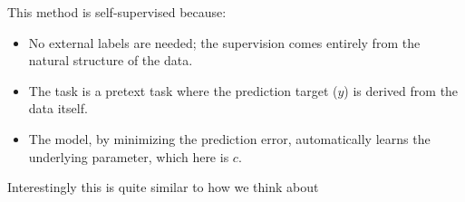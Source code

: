 \documentclass[11pt]{article}
\begin{document}
This method is self-supervised because:
\begin{itemize}
  \item No external labels are needed; the supervision comes entirely from the natural structure of the data.
  \item The task is a pretext task where the prediction target ($y$) is derived from the data itself.
  \item The model, by minimizing the prediction error, automatically learns the underlying parameter, which here is $c$.
\end{itemize}

Interestingly this is quite similar to how we think about 
\end{document}
